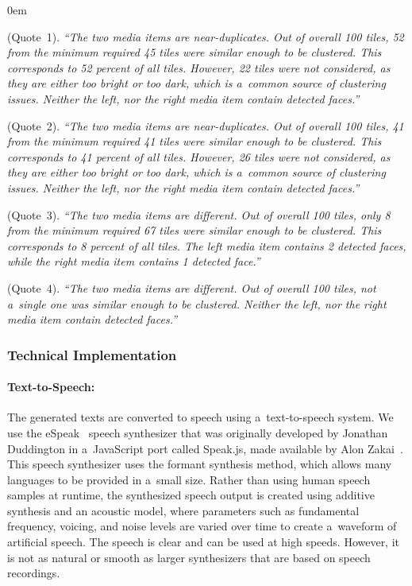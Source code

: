 \begin{description}
  \itemsep0em
  \item[Clustering Consent] (Quote~1). \textit{``The two media items
    are near-duplicates. Out of overall 100 tiles,
    52 from the minimum required 45 tiles
    were similar enough to be clustered. This corresponds to 52 percent
    of all tiles. However, 22 tiles were not considered,
    as they are either too bright or too dark,
    which is a~common source of clustering issues.
    Neither the left, nor the right media item contain detected faces.''}
  \item[Clustering Dissent] (Quote~2). \textit{``The two media items
    are near-duplicates. Out of overall 100 tiles,
    41 from the minimum required 41 tiles were similar enough to be clustered.
    This corresponds to 41 percent of all tiles.
    However, 26 tiles were not considered, as they are either too bright
    or too dark, which is a~common source of clustering issues.
    Neither the left, nor the right media item contain detected faces.''}
  \item[Non-Clustering Dissent] (Quote~3). \textit{``The two media items
    are different. Out of overall 100 tiles,
    only 8 from the minimum required 67 tiles
    were similar enough to be clustered. This corresponds to 8 percent of all tiles.
    The left media item contains 2 detected faces,
    while the right media item contains 1 detected face.''}
  \item[(Non-Clustering Consent)] (Quote~4). \textit{``The two media items
    are different. Out of overall 100 tiles, not a~single one
    was similar enough to be clustered. Neither the left,
    nor the right media item contain detected faces.''}
\end{description}

\subsubsection{Technical Implementation}

\paragraph{Text-to-Speech:}

The generated texts are converted to speech using a~text-to-speech system.
We use the eSpeak~\cite{duddington2012espeak} speech synthesizer
that was originally developed by Jonathan Duddington
in a~JavaScript port called Speak.js,
made available by Alon Zakai~\cite{zakai2012speakjs}.
This speech synthesizer uses the formant synthesis method,
which allows many languages to be provided in a~small size.
Rather than using human speech samples at runtime,
the synthesized speech output is created using additive synthesis
and an acoustic model, where parameters
such as fundamental frequency, voicing, and noise levels
are varied over time to create a~waveform of artificial speech.
The speech is clear and can be used at high speeds.
However, it is not as natural or smooth as larger synthesizers
that are based on speech recordings.

